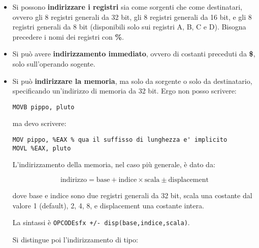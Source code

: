\documentclass[a4paper,11pt]{article}
\begin{document}
\begin{itemize}
	\item 
Si possono \textbf{indirizzare i registri} sia come sorgenti che come destinatari, ovvero gli 8 registri generali da 32 bit, gli 8 registri generali da 16 bit, e gli 8 registri generali da 8 bit (disponibili solo sui registri A, B, C e D).
Bisogna precedere i nomi dei registri con \textbf{\%}.
	\item
Si può avere \textbf{indirizzamento immediato}, ovvero di costanti preceduti da \textbf{\$}, solo sull'operando sogente.
	\item
		Si può \textbf{indirizzare la memoria}, ma solo da sorgente o solo da destinatario, specificando un'indirizzo di memoria da 32 bit.
Ergo non posso scrivere:

\begin{lstlisting}[style=codestyle]	
MOVB pippo, pluto
\end{lstlisting}

ma devo scrivere:

\begin{lstlisting}[style=codestyle]	
MOV pippo, %EAX	% qua il suffisso di lunghezza e' implicito
MOVL %EAX, pluto
\end{lstlisting}

L'indirizzamento della memoria, nel caso più generale, è dato da: 

$$ \text{indirizzo} = \text{base} + \text{indice} \times \text{scala} \pm \text{displacement} $$

dove base e indice sono due registri generali da 32 bit, scala una costante dal valore 1 (default), 2, 4, 8, e displacement una costante intera.

La sintassi è \lstinline|OPCODEsfx +/- disp(base,indice,scala)|.

Si distingue poi l'indirizzamento di tipo:


\end{itemize}
\end{document}
